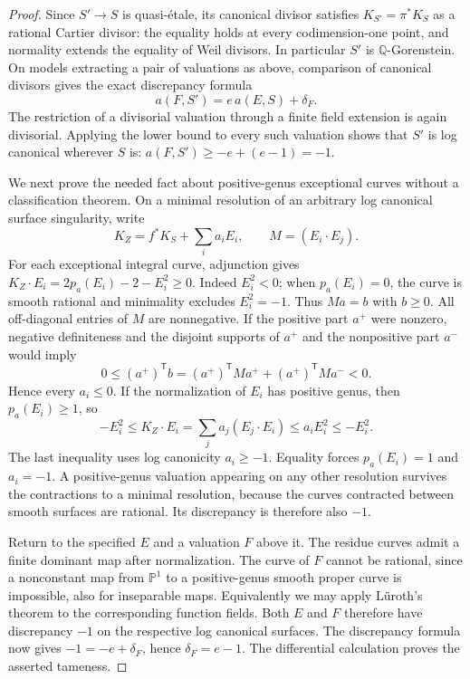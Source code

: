 \begin{proof}
Since $S'\to S$ is quasi-\'etale, its canonical divisor satisfies
$K_{S'}=\pi^*K_S$ as a rational Cartier divisor: the equality holds
at every codimension-one point, and normality extends the equality
of Weil divisors.  In particular $S'$ is $\mathbb Q$-Gorenstein.
On models extracting a pair of valuations as above, comparison of
canonical divisors gives the exact discrepancy formula
\[
 a(F,S')=e\,a(E,S)+\delta_F.
\]
The restriction of a divisorial valuation through a finite field
extension is again divisorial.  Applying the lower bound to every
such valuation shows that $S'$ is log canonical wherever $S$ is:
$a(F,S')\geq-e+(e-1)=-1$.

We next prove the needed fact about positive-genus exceptional curves
without a classification theorem.  On a minimal resolution of an
arbitrary log canonical surface singularity, write
\[
 K_Z=f^*K_S+\sum_i a_i E_i,\qquad M=(E_i\cdot E_j).
\]
For each exceptional integral curve, adjunction gives
$K_Z\cdot E_i=2p_a(E_i)-2-E_i^2\geq0$.
Indeed $E_i^2<0$; when $p_a(E_i)=0$, the curve is smooth rational
and minimality excludes $E_i^2=-1$.  Thus $Ma=b$ with $b\geq0$.
All off-diagonal entries of $M$ are nonnegative.  If the positive
part $a^+$ were nonzero, negative definiteness and the disjoint
supports of $a^+$ and the nonpositive part $a^-$ would imply
\[
 0\leq (a^+)^{\mathsf T}b
    =(a^+)^{\mathsf T}Ma^++(a^+)^{\mathsf T}Ma^-<0.
\]
Hence every $a_i\leq0$.  If the normalization of $E_i$ has positive
genus, then $p_a(E_i)\geq1$, so
\[
 -E_i^2\leq K_Z\cdot E_i
      =\sum_j a_j(E_j\cdot E_i)
      \leq a_iE_i^2\leq-E_i^2.
\]
The last inequality uses log canonicity $a_i\geq-1$.
Equality forces $p_a(E_i)=1$ and $a_i=-1$.
A positive-genus valuation appearing on any other resolution
survives the contractions to a minimal resolution, because the
curves contracted between smooth surfaces are rational.  Its
discrepancy is therefore also $-1$.

Return to the specified $E$ and a valuation $F$ above it.
The residue curves admit a finite dominant map after normalization.
The curve of $F$ cannot be rational, since a nonconstant map from
$\mathbb P^1$ to a positive-genus smooth proper curve is impossible,
also for inseparable maps.  Equivalently we may apply L\"uroth's
theorem to the corresponding function fields.  Both $E$ and $F$
therefore have discrepancy $-1$ on the respective log canonical
surfaces.  The discrepancy formula now gives
$-1=-e+\delta_F$, hence $\delta_F=e-1$.
The differential calculation proves the asserted tameness.
\end{proof}

